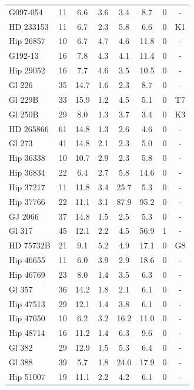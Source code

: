 \begin{landscape}
{\begin{longtable}{l|ccccccc}
G097-054  &  11 &   6.6 &   3.6 &   3.4 &   8.7 & 0 & -  \\ 
HD 233153 &  11 &   6.7 &   2.3 &   5.8 &   6.6 & 0 & K1 \citep{Montes01}  \\ 
Hip 26857  &  10 &   6.7 &   4.7 &   4.6 &  11.8 & 0 & -  \\ 
G192-13  &  16 &   7.8 &   4.3 &   4.1 &  11.4 & 0 & -  \\ 
Hip 29052  &  16 &   7.7 &   4.6 &   3.5 &  10.5 & 0 & -  \\ 
Gl 226  &  35 &  14.7 &   1.6 &   2.3 &  8.7 & 0 & -  \\ 
Gl 229B &  33 &  15.9 &   1.2 &   4.5 &   5.1 & 0 & T7 \citep{Faherty09}  \\ 
Gl 250B &  29 &   8.0 &   1.3 &   3.7 &   3.4 & 0 & K3 \citep{Gliese91}  \\ 
HD 265866  &  61 &  14.8 &   1.3 &   2.6 &   4.6 & 0 & -  \\ 
Gl 273  &  41 &  14.8 &   2.1 &   2.3 &  5.0 & 0 & -  \\ 
Hip 36338  &  10 &  10.7 &   2.9 &   2.3 &   5.8 & 0 & -  \\ 
Hip 36834  &  22 &   6.4 &   2.7 &   5.8 &  14.6 & 0 & -  \\ 
Hip 37217  &  11 &  11.8 &   3.4 &  25.7 &   5.3 & 0 & -  \\ 
Hip 37766  &  22 &  11.1 &   3.1 &  87.9 &  95.2 & 0 & -  \\ 
GJ 2066  &  37 &  14.8 &   1.5 &   2.5 &   5.3 & 0 & -  \\ 
Gl 317 &  45 &  12.1 &   2.2 &   4.5 &  56.9 & 1 & -  \\ 
HD 75732B &  21 &   9.1 &   5.2 &   4.9 &  17.1 & 0 & G8 \citep{Montes01}  \\ 
Hip 46655  &  11 &   6.0 &   3.9 &   2.9 &  18.6 & 0 & -  \\ 
Hip 46769  &  23 &   8.0 &   1.4 &   3.5 &   6.3 & 0 & -  \\ 
Gl 357  &  36 &  14.2 &   1.8 &   2.1 &   6.1 & 0 & -  \\ 
Hip 47513  &  29 &  12.1 &   1.4 &   3.8 &   6.1 & 0 & -  \\ 
Hip 47650  &  10 &   6.2 &   3.2 &  16.2 &  11.0 & 0 & -  \\ 
Hip 48714  &  16 &  11.2 &   1.4 &   6.3 &   9.6 & 0 & -  \\ 
Gl 382  &  29 &  12.9 &   1.5 &   5.3 &   6.4 & 0 & -  \\ 
Gl 388  &  39 &   5.7 &   1.8 &  24.0 &  17.9 & 0 & -  \\ 
Hip 51007  &  19 &  11.1 &   2.2 &   4.2 &   6.1 & 0 & -  \\ 

\end{longtable}}
\end{landscape}
